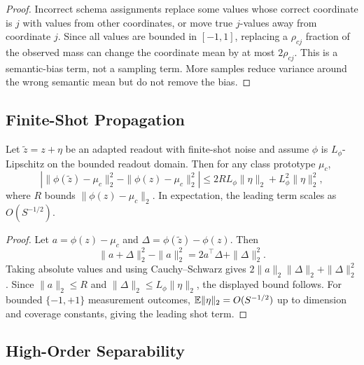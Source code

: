 \begin{proof}
Incorrect schema assignments replace some values whose correct coordinate is \(j\) with values from other coordinates, or move true \(j\)-values away from coordinate \(j\). Since all values are bounded in \([-1,1]\), replacing a \(\rho_{cj}\) fraction of the observed mass can change the coordinate mean by at most \(2\rho_{cj}\). This is a semantic-bias term, not a sampling term. More samples reduce variance around the wrong semantic mean but do not remove the bias.
\end{proof}

\subsection{Finite-Shot Propagation}

\begin{theorem}
Let \(\tilde{z}=z+\eta\) be an adapted readout with finite-shot noise and assume \(\phi\) is \(L_\phi\)-Lipschitz on the bounded readout domain. Then for any class prototype \(\mu_c\),
\begin{equation}
    \left|
    \|\phi(\tilde{z})-\mu_c\|_2^2
    -
    \|\phi(z)-\mu_c\|_2^2
    \right|
    \le
    2R L_\phi\|\eta\|_2 + L_\phi^2\|\eta\|_2^2,
\end{equation}
where \(R\) bounds \(\|\phi(z)-\mu_c\|_2\). In expectation, the leading term scales as \(O(S^{-1/2})\).
\end{theorem}

\begin{proof}
Let \(a=\phi(z)-\mu_c\) and \(\Delta=\phi(\tilde z)-\phi(z)\). Then
\begin{equation}
    \|a+\Delta\|_2^2-\|a\|_2^2=2a^\top\Delta+\|\Delta\|_2^2.
\end{equation}
Taking absolute values and using Cauchy--Schwarz gives \(2\|a\|_2\|\Delta\|_2+\|\Delta\|_2^2\). Since \(\|a\|_2\le R\) and \(\|\Delta\|_2\le L_\phi\|\eta\|_2\), the displayed bound follows. For bounded \(\{-1,+1\}\) measurement outcomes, \(\mathbb{E}\|\eta\|_2=O(S^{-1/2})\) up to dimension and coverage constants, giving the leading shot term.
\end{proof}

\subsection{High-Order Separability}

